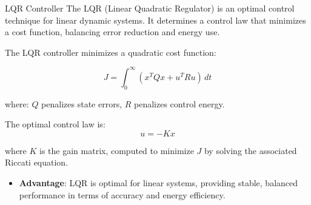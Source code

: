 \begin{frame}{LQR Controller}
The LQR (Linear Quadratic Regulator) is an optimal control technique for linear dynamic systems. It determines a control law that minimizes a cost function, balancing error reduction and energy use.

The LQR controller minimizes a quadratic cost function:

\[
J = \int_0^{\infty} \left( x^T Q x + u^T R u \right) \, dt
\]

where:
\( Q \) penalizes state errors,
\( R \) penalizes control energy.

The optimal control law is:
\[
u = -Kx
\]

where \( K \) is the gain matrix, computed to minimize \( J \) by solving the associated Riccati equation.

\begin{itemize}
\item \textbf{Advantage}: LQR is optimal for linear systems, providing stable, balanced performance in terms of accuracy and energy efficiency.
\end{itemize}
\end{frame}
